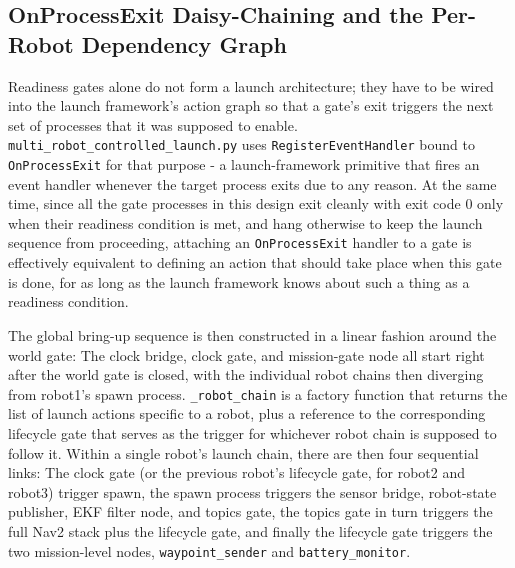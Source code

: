 \subsection{OnProcessExit Daisy-Chaining and the Per-Robot Dependency Graph}

Readiness gates alone do not form a launch architecture; they have to be wired into the launch framework's action graph so that a gate's exit triggers the next set of processes that it was supposed to enable. \texttt{multi\_robot\_controlled\_launch.py} uses \texttt{RegisterEventHandler} bound to \texttt{OnProcessExit} for that purpose - a launch-framework primitive that fires an event handler whenever the target process exits due to any reason. At the same time, since all the gate processes in this design exit cleanly with exit code 0 only when their readiness condition is met, and hang otherwise to keep the launch sequence from proceeding, attaching an \texttt{OnProcessExit} handler to a gate is effectively equivalent to defining an action that should take place when this gate is done, for as long as the launch framework knows about such a thing as a readiness condition.

The global bring-up sequence is then constructed in a linear fashion around the world gate: The clock bridge, clock gate, and mission-gate node all start right after the world gate is closed, with the individual robot chains then diverging from robot1's spawn process. \texttt{\_robot\_chain} is a factory function that returns the list of launch actions specific to a robot, plus a reference to the corresponding lifecycle gate that serves as the trigger for whichever robot chain is supposed to follow it. Within a single robot's launch chain, there are then four sequential links: The clock gate (or the previous robot's lifecycle gate, for robot2 and robot3) trigger spawn, the spawn process triggers the sensor bridge, robot-state publisher, EKF filter node, and topics gate, the topics gate in turn triggers the full Nav2 stack plus the lifecycle gate, and finally the lifecycle gate triggers the two mission-level nodes, \texttt{waypoint\_sender} and \texttt{battery\_monitor}.

